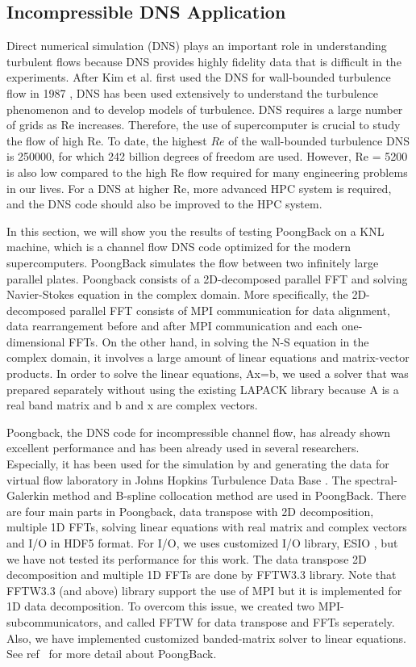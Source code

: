 \subsection{Incompressible DNS Application}
\label{sec:dns_full}

Direct numerical simulation (DNS) plays an important role in understanding turbulent flows because DNS provides highly fidelity data that is difficult in the experiments. After Kim et al. first used the DNS for wall-bounded turbulence flow in 1987 \cite{Kim:1987ub}, DNS has been used extensively to understand the turbulence phenomenon and to develop models of turbulence. DNS requires a large number of grids as Re increases. Therefore, the use of supercomputer is crucial to study the flow of high Re. To date, the highest $Re$ of the wall-bounded turbulence DNS is 250000, for which 242 billion degrees of freedom are used. \cite{Lee:2015er} However, Re = 5200 is also low compared to the high Re flow required for many engineering problems in our lives. For a DNS at higher Re, more advanced HPC system is required, and the DNS code should also be improved to the HPC system.


In this section, we will show you the results of testing PoongBack on a KNL machine, which is a channel flow DNS code optimized for the modern supercomputers. PoongBack simulates the flow between two infinitely large parallel plates. Poongback consists of a 2D-decomposed parallel FFT and solving Navier-Stokes equation in the complex domain. More specifically, the 2D-decomposed parallel FFT consists of MPI communication for data alignment, data rearrangement before and after  MPI communication and each one-dimensional FFTs. On the other hand, in solving the N-S equation in the complex domain, it involves a large amount of linear equations and matrix-vector products. In order to solve the linear equations, Ax=b, we used a solver that was prepared separately without using the existing LAPACK library because A is a real band matrix and b and x are complex vectors.

Poongback, the DNS code for incompressible channel flow, has already shown excellent performance and has been already used in several researchers. Especially, it has been used for the simulation by \cite{Lee:2015er} and generating the data for virtual flow laboratory in Johns Hopkins Turbulence Data Base \cite{Graham:2015ha}. The spectral-Galerkin method and B-spline collocation method are used in PoongBack. There are four main parts in Poongback, data transpose with 2D decomposition, multiple 1D FFTs, solving linear equations with real matrix and complex vectors and I/O in HDF5 format. For I/O, we uses customized I/O library, ESIO \cite{Lee:2014ta}, but we have not tested its performance for this work. The data transpose 2D decomposition and multiple 1D FFTs are done by FFTW3.3 library. Note that FFTW3.3 (and above) library support the use of MPI but it is implemented for 1D data decomposition. To overcom this issue, we created two MPI-subcommunicators, and called FFTW for data transpose and FFTs seperately. Also, we have implemented customized banded-matrix solver to linear equations. See ref~\cite{Lee:2013kv} for more detail about PoongBack.

